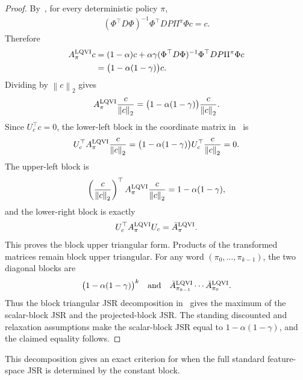 \documentclass[letterpaper]{article}
\numberwithin{equation}{section}
\begin{document}
\begin{proof}
By~, for every deterministic policy $\pi$,
\begin{align*}
  (\Phi^\top D\Phi)^{-1}\Phi^\top D P\Pi^\pi\Phi c=c.
\end{align*}
Therefore
\begin{align*}
  A_\pi^{\rm LQVI}c
  &=(1-\alpha)c
    +\alpha\gamma(\Phi^\top D\Phi)^{-1}\Phi^\top D P\Pi^\pi\Phi c\\
  &=\bigl(1-\alpha(1-\gamma)\bigr)c.
\end{align*}
Dividing by $\left\lVert c \right\rVert_2$ gives
\begin{align*}
  A_\pi^{\rm LQVI}\frac{c}{\left\lVert c \right\rVert_2}
  =\bigl(1-\alpha(1-\gamma)\bigr)\frac{c}{\left\lVert c \right\rVert_2}.
\end{align*}
Since $U_c^\top c=0$, the lower-left block in the coordinate matrix in~ is
\begin{align*}
  U_c^\top A_\pi^{\rm LQVI}\frac{c}{\left\lVert c \right\rVert_2}
  =\bigl(1-\alpha(1-\gamma)\bigr)U_c^\top\frac{c}{\left\lVert c \right\rVert_2}=0.
\end{align*}
The upper-left block is
\begin{align*}
  \left(\frac{c}{\left\lVert c \right\rVert_2}\right)^\top
  A_\pi^{\rm LQVI}\frac{c}{\left\lVert c \right\rVert_2}
  =1-\alpha(1-\gamma),
\end{align*}
and the lower-right block is exactly
\begin{align*}
  U_c^\top A_\pi^{\rm LQVI}U_c=\bar A_\pi^{\rm LQVI}.
\end{align*}
This proves the block upper triangular form. Products of the transformed matrices
remain block upper triangular. For any word $(\pi_0,\ldots,\pi_{k-1})$, the two
diagonal blocks are
\begin{align*}
  \bigl(1-\alpha(1-\gamma)\bigr)^k
  \quad\text{and}\quad
  \bar A_{\pi_{k-1}}^{\rm LQVI}\cdots\bar A_{\pi_0}^{\rm LQVI}.
\end{align*}
Thus the block triangular JSR decomposition in~
gives the maximum of the scalar-block JSR and the projected-block JSR. The
standing discounted and relaxation assumptions make the scalar-block JSR equal to
$1-\alpha(1-\gamma)$, and the claimed equality follows.
\end{proof}

This decomposition gives an exact criterion for when the full standard
feature-space JSR is determined by the constant block.
\end{document}
